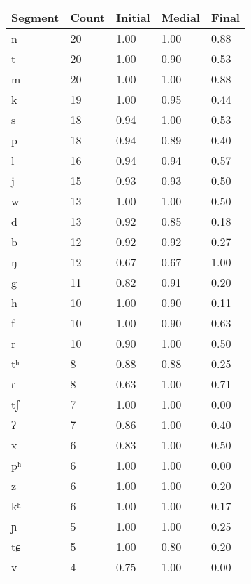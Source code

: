 \begin{longtable}{|l|l|l|l|l|}
\hline
Segment & Count & Initial & Medial & Final \\ \hline
n       & 20    & 1.00    & 1.00   & 0.88  \\ \hline
t       & 20    & 1.00    & 0.90   & 0.53  \\ \hline
m       & 20    & 1.00    & 1.00   & 0.88  \\ \hline
k       & 19    & 1.00    & 0.95   & 0.44  \\ \hline
s       & 18    & 0.94    & 1.00   & 0.53  \\ \hline
p       & 18    & 0.94    & 0.89   & 0.40  \\ \hline
l       & 16    & 0.94    & 0.94   & 0.57  \\ \hline
j       & 15    & 0.93    & 0.93   & 0.50  \\ \hline
w       & 13    & 1.00    & 1.00   & 0.50  \\ \hline
d       & 13    & 0.92    & 0.85   & 0.18  \\ \hline
b       & 12    & 0.92    & 0.92   & 0.27  \\ \hline
ŋ       & 12    & 0.67    & 0.67   & 1.00  \\ \hline
g       & 11    & 0.82    & 0.91   & 0.20  \\ \hline
h       & 10    & 1.00    & 0.90   & 0.11  \\ \hline
f       & 10    & 1.00    & 0.90   & 0.63  \\ \hline
r       & 10    & 0.90    & 1.00   & 0.50  \\ \hline
tʰ      & 8     & 0.88    & 0.88   & 0.25  \\ \hline
ɾ       & 8     & 0.63    & 1.00   & 0.71  \\ \hline
tʃ      & 7     & 1.00    & 1.00   & 0.00  \\ \hline
ʔ       & 7     & 0.86    & 1.00   & 0.40  \\ \hline
x       & 6     & 0.83    & 1.00   & 0.50  \\ \hline
pʰ      & 6     & 1.00    & 1.00   & 0.00  \\ \hline
z       & 6     & 1.00    & 1.00   & 0.20  \\ \hline
kʰ      & 6     & 1.00    & 1.00   & 0.17  \\ \hline
ɲ       & 5     & 1.00    & 1.00   & 0.25  \\ \hline
tɕ      & 5     & 1.00    & 0.80   & 0.20  \\ \hline
v       & 4     & 0.75    & 1.00   & 0.00  \\ \hline

\end{longtable}
